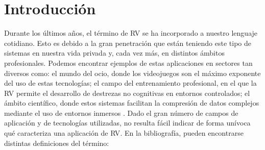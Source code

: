 \chapter{Introducción} 

\label{cap:intro}



Durante los últimos años, el término de \ac{RV} se ha incorporado a nuestro lenguaje cotidiano. Esto es debido a la gran penetración que están teniendo este tipo de sistemas en nuestra vida privada y, cada vez más, en distintos ámbitos profesionales. Podemos encontrar ejemplos de estas aplicaciones en sectores tan diversos como: el mundo del ocio, donde los videojuegos son el máximo exponente del uso de estas tecnologías; el campo del entrenamiento profesional, en el que la \ac{RV} permite el desarrollo de destrezas no cognitivas en entornos controlados\cite{PATEL2017266.e7}; el ámbito científico, donde estos sistemas facilitan la compresión de datos complejos mediante el uso de entornos inmersos \cite{usher2018}. Dado el gran número de campos de aplicación y de tecnologías utilizadas, no resulta fácil indicar de forma unívoca qué caracteriza una aplicación de \ac{RV}. En la bibliografía, pueden encontrarse distintas definiciones del término:

